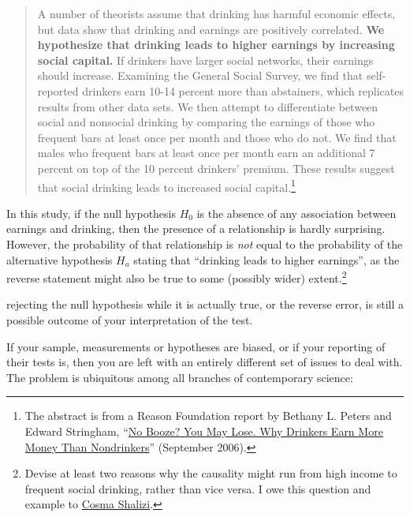 \begin{quote}
A number of theorists assume that drinking has harmful economic effects, but data show that drinking and earnings are positively correlated. \textbf{We hypothesize that drinking leads to higher earnings by increasing social capital.} If drinkers have larger social networks, their earnings should increase. Examining the General Social Survey, we find that self-reported drinkers earn 10-14 percent more than abstainers, which replicates results from other data sets. We then attempt to differentiate between social and nonsocial drinking by comparing the earnings of those who frequent bars at least once per month and those who do not. We find that males who frequent bars at least once per month earn an additional 7 percent on top of the 10 percent drinkers' premium. These results suggest that social drinking leads to increased social capital.\footnote{The abstract is from a Reason Foundation report by Bethany L. Peters and Edward Stringham, ``\href{http://reason.org/news/show/127594.html}{No Booze? You May Lose. Why Drinkers Earn More Money Than Nondrinkers}'' (September 2006).}
\end{quote}

In this study, if the null hypothesis $H_0$ is the absence of any association between earnings and drinking, then the presence of a relationship is hardly surprising. However, the probability of that relationship is \emph{not} equal to the probability of the alternative hypothesis $H_a$ stating that ``drinking leads to higher earnings'', as the reverse statement might also be true to some (possibly wider) extent.\footnote{Devise at least two reasons why the causality might run from high income to frequent social drinking, rather than vice versa. I owe this question and example to \href{https://pinboard.in/u:cshalizi/b:d54b8c984beb}{Cosma Shalizi}.}

 rejecting the null hypothesis while it is actually true, or the reverse error, is still a possible outcome of your interpretation of the test. 

 If your sample, measurements or hypotheses are biased, or if your reporting of their tests is, then you are left with an entirely different set of issues to deal with. The problem is ubiquitous among all branches of contemporary science:

